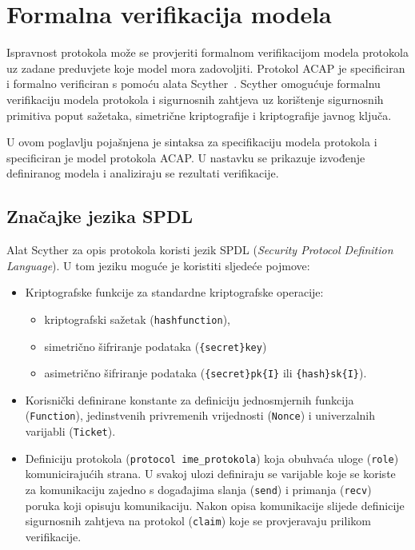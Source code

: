\chapter{Formalna verifikacija modela}
\label{ch:verif}

Ispravnost protokola može se provjeriti formalnom verifikacijom modela protokola
uz zadane preduvjete koje model
mora zadovoljiti. Protokol ACAP je specificiran i formalno verificiran s pomoću
alata Scyther~\cite{cremers2007scyther}. Scyther omogućuje formalnu verifikaciju
modela protokola i sigurnosnih zahtjeva uz korištenje sigurnosnih
primitiva poput sažetaka, simetrične kriptografije i kriptografije javnog ključa.


U ovom poglavlju pojašnjena je sintaksa za specifikaciju modela protokola i
specificiran je model protokola ACAP. U nastavku se prikazuje izvođenje
definiranog modela i analiziraju se rezultati verifikacije.

\section{Značajke jezika SPDL}

Alat Scyther za opis protokola koristi jezik SPDL (\emph{Security Protocol Definition
Language}). U tom jeziku moguće je koristiti sljedeće pojmove:
\begin{itemize}
\item Kriptografske funkcije za standardne kriptografske operacije:
    \begin{itemize}
	\item kriptografski sažetak (\texttt{hashfunction}), 
	\item simetrično šifriranje podataka (\texttt{\{secret\}key})
	\item asimetrično šifriranje podataka (\texttt{\{secret\}pk\{I\}} ili
	    \texttt{\{hash\}sk\{I\}}).
    \end{itemize}
\item Korisnički definirane konstante za definiciju jednosmjernih funkcija
    (\texttt{Function}), jedinstvenih privremenih vrijednosti
    (\texttt{Nonce}) i univerzalnih varijabli (\texttt{Ticket}).
\item Definiciju protokola (\texttt{protocol ime\_protokola}) koja obuhvaća
    uloge (\texttt{role}) komunicirajućih strana. U svakoj
    ulozi definiraju se varijable koje se koriste za komunikaciju zajedno s
    događajima slanja (\texttt{send}) i primanja (\texttt{recv}) poruka koji
    opisuju komunikaciju. Nakon opisa komunikacije slijede definicije
    sigurnosnih zahtjeva na protokol (\texttt{claim}) koje se provjeravaju
    prilikom verifikacije.
\end{itemize}

